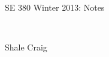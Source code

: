 \ifdefined\isphone
  
\else
  
\fi


\newcommand{\Sln}{\textbf{Solution.} }
\newcommand{\Lap}{$\Lapm$}
\newcommand{\Lapm}{\mathcal{L}}
\newcommand{\dy}{\dot{y}}
\newcommand{\dx}{\dot{x}}
\newcommand{\ddy}{\ddot{y}}
\newcommand{\ddx}{\ddot{x}}
\newcommand{\chpm}{characteristic polynomial}

\DefineShortVerb{\#}

\begin{center}
\Large{SE 380 Winter 2013: Notes} \\
\end{center}



\hrulefill\

\hfill Shale Craig


